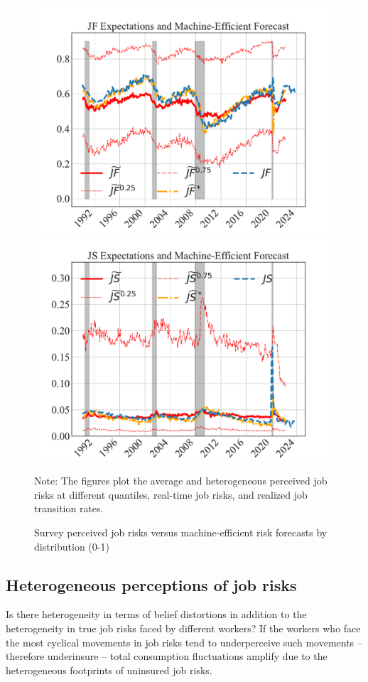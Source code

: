 \begin{figure}[pt] 
\centering 
	\caption{Survey perceived job risks versus machine-efficient risk forecasts by distribution (0-1)} 
	\label{fig:survey_versus_machine_dist}
\includegraphics[width=0.7\linewidth]{text/chapter2/Figures/real_time_survey_machine_realization_1step_JF_dist.pdf} \\
\includegraphics[width=0.7\linewidth]{text/chapter2/Figures/real_time_survey_machine_realization_1step_JS_dist.pdf} 
	\begin{flushleft}\footnotesize {Note: The figures plot the average and heterogeneous perceived job risks at different quantiles, real-time job risks, and realized job transition rates.} \end{flushleft}
\end{figure}


\subsection{Heterogeneous perceptions of job risks}\label{subsec:hetero_beliefs}

Is there heterogeneity in terms of belief distortions in addition to the heterogeneity in true job risks faced by different workers? If the workers who face the most cyclical movements in job risks tend to underperceive such movements -- therefore underinsure -- total consumption fluctuations amplify due to the heterogeneous footprints of uninsured job risks.  

